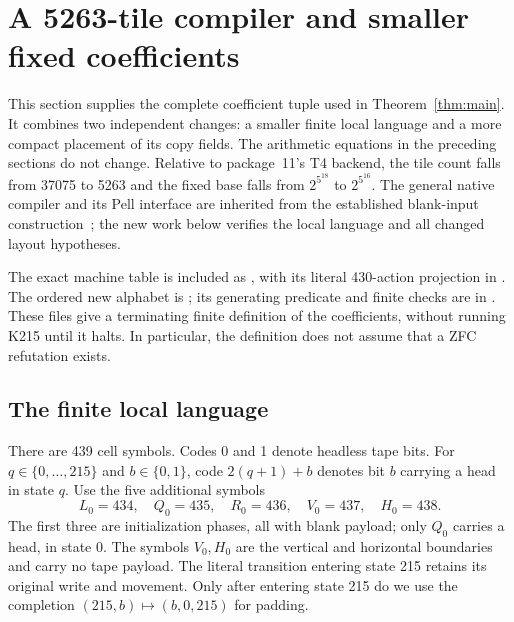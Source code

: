 \section{A 5263-tile compiler and smaller fixed coefficients}
\label{sec:coefficients}

This section supplies the complete coefficient tuple used in
Theorem~\ref{thm:main}.  It combines two independent changes: a smaller
finite local language and a more compact placement of its copy fields.
The arithmetic equations in the preceding sections do not change.
Relative to package~11's T4 backend, the tile count falls from 37075 to
5263 and the fixed base falls from $2^{5^{18}}$ to $2^{5^{16}}$.
The general native compiler and its Pell interface are inherited from
the established blank-input construction~\cite{blank,t4,rank}; the new
work below verifies the local language and all changed layout hypotheses.

The exact machine table is included as , with
its literal 430-action projection in
.  The ordered new alphabet is
; its generating predicate and finite
checks are in .  These files give a
terminating finite definition of the coefficients, without running K215
until it halts.  In particular, the definition does not assume that a
ZFC refutation exists.

\subsection{The finite local language}

There are 439 cell symbols.  Codes 0 and 1 denote headless tape bits.
For $q\in\{0,\ldots,215\}$ and $b\in\{0,1\}$, code $2(q+1)+b$
denotes bit $b$ carrying a head in state $q$.  Use the five additional
symbols
\[
 L_0=434,\quad Q_0=435,\quad R_0=436,\quad V_0=437,\quad H_0=438.
\]
The first three are initialization phases, all with blank payload;
only $Q_0$ carries a head, in state 0.  The symbols $V_0,H_0$ are the
vertical and horizontal boundaries and carry no tape payload.  The
literal transition entering state 215 retains its original write and
movement.  Only after entering state 215 do we use the completion
$(215,b)\mapsto(b,0,215)$ for padding.

